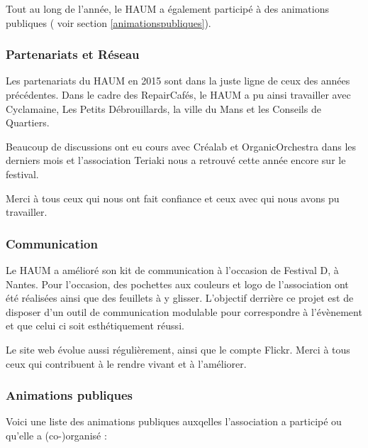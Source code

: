 \documentclass[a4paper, 11pt]{article}
\begin{document}
Tout au long de l'année, le HAUM a également participé à des animations publiques ( voir section \ref{animationspubliques}).


\subsubsection{Partenariats et Réseau}

Les partenariats du HAUM en 2015 sont dans la juste ligne de ceux des années précédentes. Dans le cadre des
RepairCafés, le HAUM a pu ainsi travailler avec Cyclamaine, Les Petits Débrouillards, la ville du Mans et les Conseils de Quartiers.

Beaucoup de discussions ont eu cours avec Créalab et OrganicOrchestra dans les derniers mois et l'association Teriaki
nous a retrouvé cette année encore sur le festival.

Merci à tous ceux qui nous ont fait confiance et ceux avec qui nous avons pu travailler.

\subsubsection{Communication}

Le HAUM a amélioré son kit de communication à l'occasion de Festival D, à Nantes. Pour l'occasion, des pochettes aux
couleurs et logo de l'association ont été réalisées ainsi que des feuillets à y glisser. L'objectif derrière ce projet
est de disposer d'un outil de communication modulable pour correspondre à l'évènement et que celui ci soit esthétiquement réussi.

Le site web évolue aussi régulièrement, ainsi que le compte Flickr. Merci à tous ceux qui contribuent à le rendre vivant et à l'améliorer.

\subsubsection{Animations publiques \label{animationspubliques}}

Voici une liste des animations publiques auxqelles l'association a participé ou qu'elle a (co-)organisé :
\end{document}
